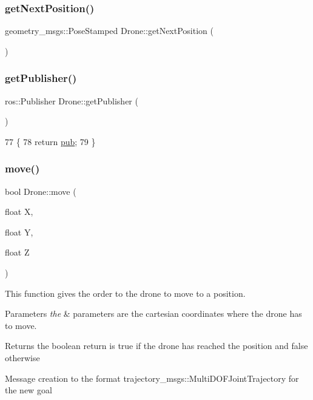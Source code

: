 \subsubsection{\texorpdfstring{get\+Next\+Position()}{getNextPosition()}\hspace{0.1cm}{\footnotesize\ttfamily [2/2]}}
{\footnotesize\ttfamily geometry\+\_\+msgs\+::\+Pose\+Stamped Drone\+::get\+Next\+Position (\begin{DoxyParamCaption}{ }\end{DoxyParamCaption})}

\mbox{\label{classDrone_aac0983a112b0b3f75c0e625bcba3a330}} 
\subsubsection{\texorpdfstring{get\+Publisher()}{getPublisher()}}
{\footnotesize\ttfamily ros\+::\+Publisher Drone\+::get\+Publisher (\begin{DoxyParamCaption}{ }\end{DoxyParamCaption})}


\begin{DoxyCode}
77 \{
78     \textcolor{keywordflow}{return} \hyperlink{classDrone_a4bdfc664da2ebff40d9a4b413e4ea768}{pub};
79 \}
\end{DoxyCode}
\mbox{\label{classDrone_a106284f63c05f3f112435b2cb5c4896c}} 
\subsubsection{\texorpdfstring{move()}{move()}\hspace{0.1cm}{\footnotesize\ttfamily [1/2]}}
{\footnotesize\ttfamily bool Drone\+::move (\begin{DoxyParamCaption}\item[{float}]{X,  }\item[{float}]{Y,  }\item[{float}]{Z }\end{DoxyParamCaption})}

This function gives the order to the drone to move to a position. 
\begin{DoxyParams}{Parameters}
{\em the} & parameters are the cartesian coordinates where the drone has to move. \\
\hline
\end{DoxyParams}
\begin{DoxyReturn}{Returns}
the boolean return is true if the drone has reached the position and false otherwise 
\end{DoxyReturn}
Message creation to the format trajectory\+\_\+msgs\+::\+Multi\+D\+O\+F\+Joint\+Trajectory for the new goal

